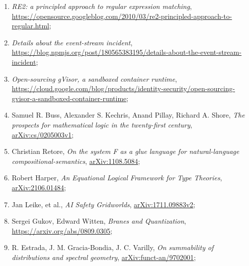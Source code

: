 \documentclass[a4paper,11pt]{article}
\begin{document}
\begin{enumerate}
\item \emph{RE2: a principled approach to regular expression
    matching}, \\
  \href{https://opensource.googleblog.com/2010/03/re2-principled-approach-to-regular.html}{https://opensource.googleblog.com/2010/03/re2-principled-approach-to-regular.html};

\item \emph{Details about the event-stream incident}, \\
  \href{https://blog.npmjs.org/post/180565383195/details-about-the-event-stream-incident}{https://blog.npmjs.org/post/180565383195/details-about-the-event-stream-incident};

\item \emph{Open-sourcing gVisor, a sandboxed container runtime}, \\
  \href{https://cloud.google.com/blog/products/identity-security/open-sourcing-gvisor-a-sandboxed-container-runtime}{https://cloud.google.com/blog/products/identity-security/open-sourcing-gvisor-a-sandboxed-container-runtime};

\item Samuel R. Buss, Alexander S. Kechris, Anand Pillay, Richard A.
  Shore, \emph{The prospects for mathematical logic in the
    twenty-first century},
  \href{https://arxiv.org/abs/cs/0205003v1}{arXiv:cs/0205003v1};

\item Christian Retore, \emph{On the system F as a glue language for
    natural-language compositional-semantics},
  \href{https://arxiv.org/abs/1108.5084}{arXiv:1108.5084};

\item Robert Harper, \emph{An Equational Logical Framework for Type
    Theories},
  \href{https://arxiv.org/abs/2106.01484}{arXiv:2106.01484};

\item Jan Leike, et al., \emph{AI Safety Gridworlds},
  \href{https://arxiv.org/abs/1711.09883}{arXiv:1711.09883v2};

\item Sergei Gukov, Edward Witten, \emph{Branes and Quantization},
  \href{https://arxiv.org/abs/0809.0305}{https://arxiv.org/abs/0809.0305};

\item R. Estrada, J. M. Gracia-Bondia, J. C. Varilly, \emph{On
    summability of distributions and spectral geometry},
  \href{https://arxiv.org/abs/funct-an/9702001v1}{arXiv:funct-an/9702001};


\end{enumerate}
\end{document}
